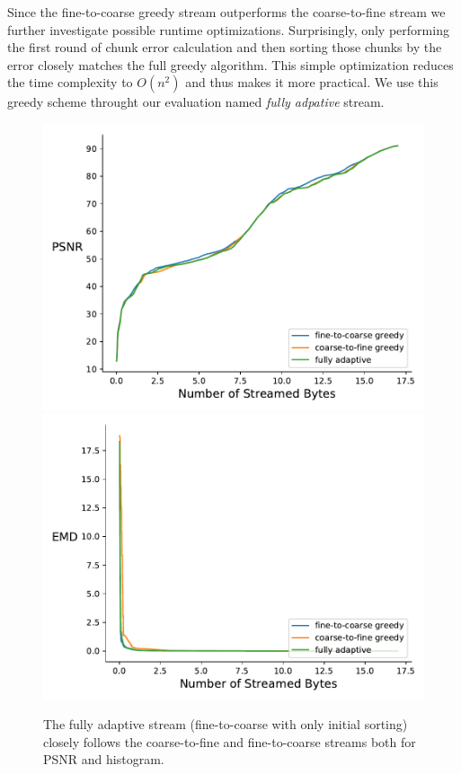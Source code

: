 Since the fine-to-coarse greedy stream outperforms the coarse-to-fine stream we further investigate possible
runtime optimizations. Surprisingly, only performing the first round of chunk error calculation and then sorting
those chunks by the error closely matches the full greedy algorithm. This simple optimization reduces the time
complexity to $O(n^2)$ and thus makes it more practical. We use this greedy scheme throught our evaluation named
\emph{fully adpative} stream.

\begin{figure}
        \centering
        \includegraphics[width=0.48\linewidth]{img/figure6/rmse-miranda-viscosity}
        \includegraphics[width=0.48\linewidth]{img/figure6/histogram-miranda-viscosity}
        \caption{The fully adaptive stream (fine-to-coarse with only initial sorting) closely follows the coarse-to-fine and
                 fine-to-coarse streams both for PSNR and histogram.}
\end{figure}
